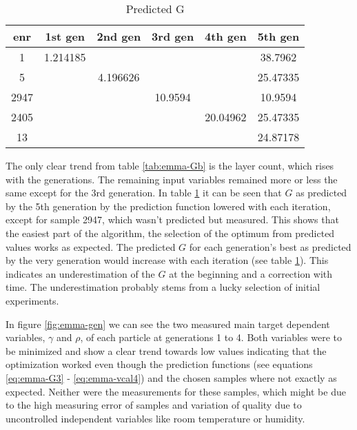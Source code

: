 \begin{table}
	\centering
    \caption{Predicted G} 
    \label{tab:emma-pred-G}
    \begin{tabular}{cccccc}
        \hline\hline
    enr     &1st gen     &2nd gen        &3rd gen        &4th gen        &5th gen\\
        \hline
    1       &1.214185    &       &       &       &38.7962       \\
    5       &       &4.196626       &       &       &25.47335       \\
    2947    &       &       &10.9594    &       &10.9594       \\
    2405    &       &       &       &20.04962   &25.47335       \\
    13      &       &       &       &       &24.87178   \\
        \hline\hline
    \end{tabular}
\end{table}

The only clear trend from table \ref{tab:emma-Gb} is the layer count, which rises with the generations. 
The remaining input variables remained more or less the same except for the 3rd generation. 
%
In table \ref{tab:emma-pred-G} it can be seen that $G$ as predicted 
by the 5th generation by the prediction function lowered with each iteration, 
except for sample 2947, which wasn't predicted but measured. 
This shows that the easiest part of the algorithm, the selection of the optimum 
from predicted values works as expected. 
%
The predicted $G$ for each generation's best as predicted 
by the very generation would increase with each iteration (see table \ref{tab:emma-pred-G}). 
This indicates an underestimation of the $G$ at the beginning and a correction with time. 
The underestimation probably stems from a lucky selection of initial experiments. 

In figure \ref{fig:emma-gen} we can see the two measured main target dependent variables, $\gamma$ and $\rho$, of each particle at generations 1 to 4. 
Both variables were to be minimized and show a clear trend towards low values indicating 
that the optimization worked even though 
the prediction functions (see equations \ref{eq:emma-G3} - \ref{eq:emma-vcal4}) 
and the chosen samples where not exactly as expected. 
Neither were the measurements for these samples, which might be due to the high measuring error of samples and variation of quality due to uncontrolled independent variables like room temperature or humidity. 


